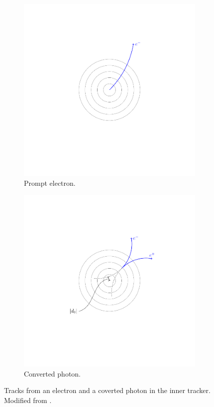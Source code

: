 \begin{figure}[htbp]
  \centering
  \begin{subfigure}{0.49\textwidth}
    \centering
    \includegraphics[trim = 35mm 40mm 30mm 30mm, clip,width=\textwidth]{doca_electron}
    \caption{Prompt electron.}
    \label{fig:electron_path}
  \end{subfigure}
  \begin{subfigure}{0.49\textwidth}
    \centering
    \includegraphics[trim = 35mm 40mm 30mm 30mm, clip,width=\textwidth]{doca}
    \caption{Converted photon.}
    \label{fig:photon_path}
  \end{subfigure}
  \caption{Tracks from an electron and a coverted photon in the inner tracker. Modified from \cite{barge2009conversion}.}
  \label{fig:conversion}
\end{figure}


